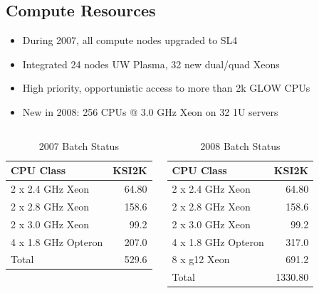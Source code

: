 \documentclass{beamer}
\begin{document}
\subsection{Compute Resources}
\begin{frame}
\begin{itemize}
    \item During 2007, all compute nodes upgraded to SL4
    \item Integrated 24 nodes UW Plasma, 32 new dual/quad Xeons
    \item High priority, opportunistic access to more than 2k GLOW CPUs
    \item New in 2008: 256 CPUs @ 3.0 GHz Xeon on 32 1U servers
\end{itemize}
\begin{columns}
\column{2.5in}
\begin{table}
    \begin{tabular}{lr}
        \toprule
        CPU Class           & KSI2K \\
        \midrule
        2 x 2.4 GHz Xeon    & 64.80 \\    %
        2 x 2.8 GHz Xeon    & 158.6 \\    %
        2 x 3.0 GHz Xeon    & 99.2 \\     %
        4 x 1.8 GHz Opteron & 207.0 \\    %
        \midrule
        Total & 529.6 \\
        \bottomrule
    \end{tabular}
    \caption{2007 Batch Status}
    \label{2007_Batch_status}
\end{table}

\column{2.5in}
\begin{table}
    \begin{tabular}{lr}
        \toprule
        CPU Class           & KSI2K \\
        \midrule
        2 x 2.4 GHz Xeon    & 64.80 \\    %
        2 x 2.8 GHz Xeon    & 158.6 \\    %
        2 x 3.0 GHz Xeon    & 99.2 \\     %
        4 x 1.8 GHz Opteron & 317.0 \\    %
        8 x g12 Xeon        & 691.2 \\    %
        \midrule
        Total & 1330.80 \\
        \bottomrule
    \end{tabular}
    \caption{2008 Batch Status}
    \label{2008_Batch_status}
\end{table}
\end{columns}
\end{frame}
\end{document}
